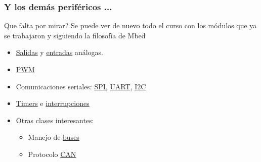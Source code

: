 \documentclass[10.5pt,scale=1.0,t,aspectratio=169,hyperref={pdfpagelabels=false}]{beamer}
\begin{document}
\begin{frame}
	\frametitle{Y los demás periféricos ...}
	Que falta por mirar? Se puede ver de nuevo todo el curso con los módulos que ya se trabajaron y siguiendo la filosofía de Mbed
	\begin{itemize}
		\item \href{https://os.mbed.com/docs/mbed-os/v6.15/apis/analogout.html}{Salidas} y \href{https://os.mbed.com/docs/mbed-os/v6.15/apis/i-o-apis.html}{entradas} análogas.
		\item \href{https://os.mbed.com/docs/mbed-os/v6.15/apis/pwmout.html}{PWM}
		\item Comunicaciones seriales: \href{https://os.mbed.com/docs/mbed-os/v6.15/apis/spi.html}{SPI}, \href{https://os.mbed.com/docs/mbed-os/v6.15/apis/serial-uart-apis.html}{UART}, \href{https://os.mbed.com/docs/mbed-os/v6.15/apis/i2c.html}{I2C}
		\item \href{https://os.mbed.com/docs/mbed-os/v6.15/apis/timer.html}{Timers} e \href{https://os.mbed.com/docs/mbed-os/v6.15/apis/interruptin.html}{interrupciones}
		\item Otras clases interesantes:
		\begin{itemize}
			\item Manejo de \href{https://os.mbed.com/docs/mbed-os/v6.15/apis/busout.html}{buses}
			\item Protocolo \href{https://os.mbed.com/docs/mbed-os/v6.15/apis/other-driver-apis.html}{CAN}
		\end{itemize}
	\end{itemize}
\end{frame}
\frame{
\begin{center}
	\LARGE \textcolor{blue}{MBED}
\end{center}

\begin{center}
	\LARGE \textcolor{blue}{GRACIAS}
\end{center}
}

\end{document}
